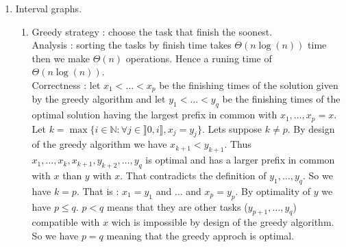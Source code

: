 \documentclass[12pt,4paper]{article}
\begin{document}
\begin{enumerate}
\item Interval graphs.

\begin{enumerate}
    \item Greedy strategy : choose the task that finish the soonest.\\
    Analysis : sorting the tasks by finish time takes $\Theta(n\log(n))$ time then we make $\Theta(n)$ operations. Hence a runing time of $\Theta(n\log(n))$.\\
    Correctness : let $x_1 < \dots < x_p$ be the finishing times of the solution given by the greedy algorithm and let $y_1 < \dots < y_q$ be the finishing times of the optimal solution having the largest prefix in common with $x_1, \dots, x_p = x$. Let $k = \max \{ i \in \mathbb{N} : \forall j \in \rrbracket 0, i \rrbracket, x_j = y_j \}$. Lets suppose $k \neq p$. By design of the greedy algorithm we have $x_{k + 1} < y_{k + 1}$. Thus $x_1, \dots, x_k, x_{k + 1}, y_{k + 2}, \dots, y_q$ is optimal and has a larger prefix in common with $x$ than $y$ with $x$. That contradicts the definition of $y_1, \dots, y_q$. So we have $k = p$. That is : $x_1 = y_1$ and $\dots$ and $x_p = y_p $. By optimality of $y$ we have $p \leq q$. $p < q$ means that they are other tasks ($y_{p + 1}, \dots, y_q$) compatible with $x$ wich is impossible by design of the greedy algorithm. So we have $p=q$ meaning that the greedy approch is optimal.


\end{enumerate}
\end{enumerate}
\end{document}
